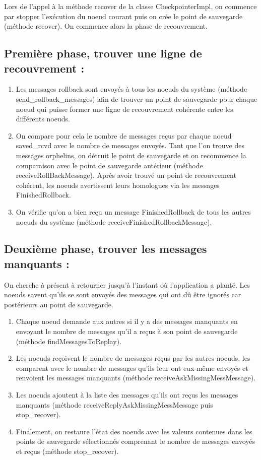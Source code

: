 \documentclass[11pt,a4paper]{report}
\begin{document}
Lors de l'appel à la méthode recover de la classe CheckpointerImpl, on commence par stopper l'exécution du noeud courant puis on crée le point de sauvegarde (méthode recover). On commence alors la phase de recouvrement.

\subsection{Première phase, trouver une ligne de recouvrement :}
\begin{enumerate}
\item Les messages rollback sont envoyés à tous les noeuds du système (méthode send\_rollback\_messages) afin de trouver un point de sauvegarde pour chaque noeud qui puisse former une ligne de recouvrement cohérente entre les différents noeuds.
\item On compare pour cela le nombre de messages reçus par chaque noeud saved\_rcvd avec le nombre de messages envoyés. Tant que l'on trouve des messages orphelins, on détruit le point de sauvegarde et on recommence la comparaison avec le point de sauvegarde antérieur (méthode receiveRollBackMessage). Après avoir trouvé un point de recouvrement cohérent, les noeuds avertissent leurs homologues via les messages FinishedRollback.
\item On vérifie qu'on a bien reçu un message FinishedRollback de tous les autres noeuds du système (méthode receiveFinishedRollbackMessage).
\end{enumerate}

\subsection{Deuxième phase, trouver les messages manquants :}

On cherche à présent à retourner jusqu'à l'instant où l'application a planté. Les noeuds savent qu'ils se sont envoyés des messages qui ont dû être ignorés car postérieurs au point de sauvegarde.
\begin{enumerate}
\item Chaque noeud demande aux autres si il y a des messages manquants en envoyant le nombre de messages qu'il a reçus à son point de sauvegarde (méthode findMessagesToReplay).
\item Les noeuds reçoivent le nombre de messages reçus par les autres noeuds, les comparent avec le nombre de messages qu'ils leur ont eux-même envoyés et renvoient les messages manquants (méthode receiveAskMissingMessMessage).
\item Les noeuds ajoutent à la liste des messages qu'ils ont reçus les messages manquants (méthode receiveReplyAskMissingMessMessage puis stop\_recover).
\item Finalement, on restaure l'état des noeuds avec les valeurs contenues dans les points de sauvegarde sélectionnés comprenant le nombre de messages envoyés et reçus (méthode stop\_recover).
\end{enumerate}
\end{document}

